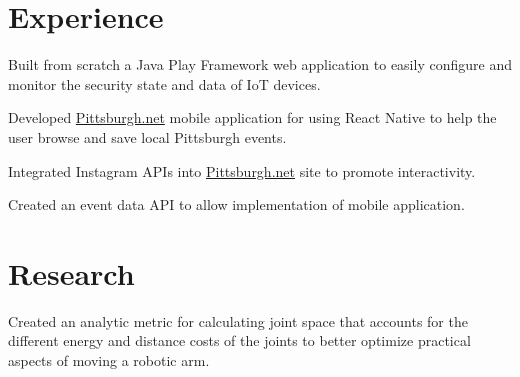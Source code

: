 \documentclass[]{resume-font}
\begin{document}
\begin{minipage}[t]{0.59\textwidth} 


\section{Experience}

\vspace{\topsep} %
\begin{tightemize}
    \item Built from scratch a Java Play Framework web application to easily configure and monitor the security state and data of IoT devices.
\end{tightemize}

\vspace{\topsep} %
\begin{tightemize}
    \item Developed \href{http://www.pittsburgh.net/}{Pittsburgh.net} mobile application for using React Native to help the user browse and save local Pittsburgh events.
\end{tightemize}
\vspace{3 pt}
\begin{tightemize}
    \item Integrated Instagram APIs into \href{http://www.pittsburgh.net/}{Pittsburgh.net} site to promote interactivity.
    \item Created an event data API to allow implementation of mobile application.
\end{tightemize}

\sectionsep


\section{Research}
\begin{tightemize}
    \item Created an analytic metric for calculating joint space that accounts for the different energy and distance costs of the joints to better optimize practical aspects of moving a robotic arm.
\end{tightemize}


\end{minipage}
\end{document}
